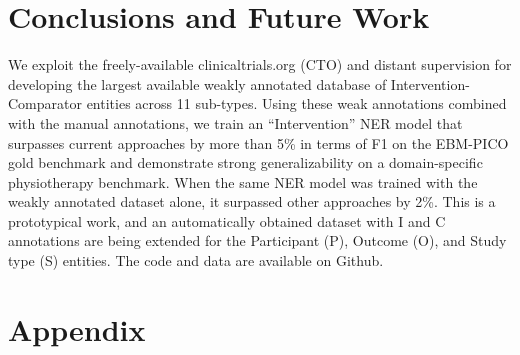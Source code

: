 \documentclass[11pt]{article}
\begin{document}
%
%
%
\section{Conclusions and Future Work}
\label{sec:conclusion}
%
We exploit the freely-available clinicaltrials.org (CTO) and distant supervision for developing the largest available weakly annotated database of Intervention-Comparator entities across 11 sub-types.
Using these weak annotations combined with the manual annotations, we train an ``Intervention'' NER model that surpasses current approaches by more than 5\% in terms of F1 on the EBM-PICO gold benchmark and demonstrate strong generalizability on a domain-specific physiotherapy benchmark.
When the same NER model was trained with the weakly annotated dataset alone, it surpassed other approaches by 2\%.
This is a prototypical work, and an automatically obtained dataset with I and C annotations are being extended for the Participant (P), Outcome (O), and Study type (S) entities.
The code and data are available on Github.
%
%




\appendix

\section{Appendix}
\label{sec:appendix}
%
\end{document}
